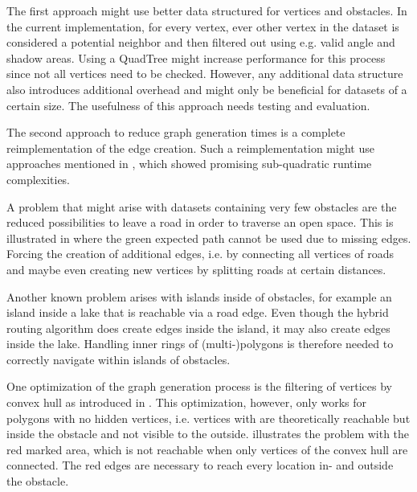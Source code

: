 		The first approach might use better data structured for vertices and obstacles.
		In the current implementation, for every vertex, ever other vertex in the dataset is considered a potential neighbor and then filtered out using e.g. valid angle and shadow areas.
		Using a QuadTree might increase performance for this process since not all vertices need to be checked.
		However, any additional data structure also introduces additional overhead and might only be beneficial for datasets of a certain size.
		The usefulness of this approach needs testing and evaluation.
		
		The second approach to reduce graph generation times is a complete reimplementation of the edge creation.
		Such a reimplementation might use approaches mentioned in , which showed promising sub-quadratic runtime complexities.
				
		A problem that might arise with datasets containing very few obstacles are the reduced possibilities to leave a road in order to traverse an open space.
		This is illustrated in  where the green expected path cannot be used due to missing edges.
		Forcing the creation of additional edges, i.e. by connecting all vertices of roads and maybe even creating new vertices by splitting roads at certain distances.
		
		Another known problem arises with islands inside of obstacles, for example an island inside a lake that is reachable via a road edge.
		Even though the hybrid routing algorithm does create edges inside the island, it may also create edges inside the lake.
		Handling inner rings of (multi-)polygons is therefore needed to correctly navigate within islands of obstacles.
		
		One optimization of the graph generation process is the filtering of vertices by convex hull as introduced in .
		This optimization, however, only works for polygons with no hidden vertices, i.e. vertices with are theoretically reachable but inside the obstacle and not visible to the outside.
		 illustrates the problem with the red marked area, which is not reachable when only vertices of the convex hull are connected.
		The red edges are necessary to reach every location in- and outside the obstacle.
		
